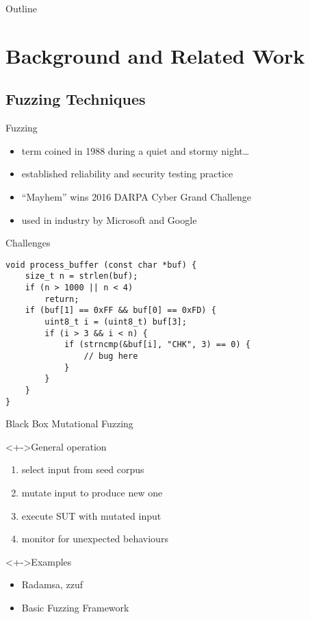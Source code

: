 \documentclass[\HandoutMode,table]{beamer}
\title{\myTitle}
\subtitle{\mySubtitle}
\author{\myName}
\institute[VU]{\myUni}
\begin{document}
\frame{\titlepage}

\begin{frame}{Outline}
    \tableofcontents[pausesections]
\end{frame}

\section{Background and Related Work}

\subsection{Fuzzing Techniques}

\begin{frame}{Fuzzing}
    \begin{itemize}
        \item<1-> term coined in 1988 during a quiet and stormy night\ldots\
        \item<2-> established reliability and security testing practice
        \item<2-> ``Mayhem'' wins 2016 DARPA Cyber Grand Challenge
        \item<2-> used in industry by Microsoft and Google
    \end{itemize}
\end{frame}

\begin{frame}[fragile]{Challenges}
\begin{lstlisting}[language={[modern]C},style=numbered]
void process_buffer (const char *buf) {
    size_t n = strlen(buf);
    if (n > 1000 || n < 4)
        return;
    if (buf[1] == 0xFF && buf[0] == 0xFD) {
        uint8_t i = (uint8_t) buf[3];
        if (i > 3 && i < n) {
            if (strncmp(&buf[i], "CHK", 3) == 0) {
                // bug here
            }
        }
    }
}
\end{lstlisting}
\end{frame}

\begin{frame}{Black Box Mutational Fuzzing}
    \begin{block}<+->{General operation}
        \begin{enumerate}[<+->]
            \item{} select input from seed corpus
            \item{} mutate input to produce new one
            \item{} execute SUT with mutated input
            \item{} monitor for unexpected behaviours
        \end{enumerate}
    \end{block}
    \begin{exampleblock}<+->{Examples}
        \begin{itemize}
            \item{} Radamsa, zzuf
            \item{} Basic Fuzzing Framework
        \end{itemize}
    \end{exampleblock}
\end{frame}
\end{document}
